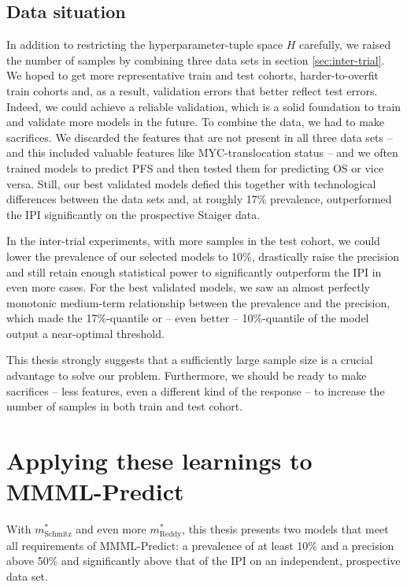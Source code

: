 \subsection{Data situation}\label{subsec:discussion-data}

In addition to restricting the hyperparameter-tuple space $H$ carefully, we raised the number of 
samples by combining three data sets in section \ref{sec:inter-trial}. We hoped to get more representative train and 
test cohorts, harder-to-overfit train cohorts and, as a result, validation errors that better 
reflect test errors. Indeed, we could achieve a reliable validation, which is 
a solid foundation to train and validate more models in the future. To combine the data, we had to 
make sacrifices. We discarded the features that are not present in all three data sets -- and this 
included valuable features like MYC-translocation status \cite{klapper08} -- and we often trained 
models to predict PFS and then tested them for predicting OS or vice versa. Still, our best 
validated models defied this together with technological differences between the data sets and, at 
roughly \num{17}\% prevalence, outperformed the IPI significantly on the prospective Staiger data.

In the inter-trial experiments, with more samples in the test cohort, we could lower the prevalence 
of our selected models to \num{10}\%, drastically raise the precision and still retain enough 
statistical power to significantly outperform the IPI in even more cases. For the best validated models, 
we saw an almost perfectly monotonic medium-term relationship between the prevalence 
and the precision, which made the \num{17}\%-quantile or -- even better -- \num{10}\%-quantile of 
the model output a near-optimal threshold. 

This thesis strongly suggests that a sufficiently large sample size is a crucial advantage to solve 
our problem. Furthermore, we should be ready to make sacrifices -- less features, 
even a different kind of the response -- to increase the number of samples in both train and test 
cohort. 

\section{Applying these learnings to MMML-Predict}\label{subsec:discussion-mmml}

With $m^*_\text{Schmitz}$ and even more $m^*_\text{Reddy}$, this thesis presents two 
models that meet all requirements of MMML-Predict: a prevalence of at least \num{10}\% and a 
precision above \num{50}\% and significantly above that of the IPI on an independent, prospective 
data set. 

